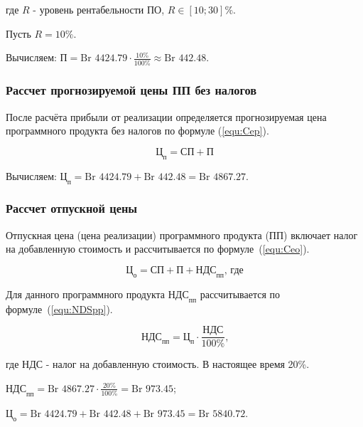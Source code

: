 где $R$ - уровень рентабельности ПО, $R \in [10;30]\%$.

Пусть $R = 10\%$.

Вычисляем: $\text{П} = \text{Br } 4424.79 \cdot \frac{ 10\% }{ 100\% } \approx \text{Br } 442.48$.

\subsubsection*{Рассчет прогнозируемой цены ПП без налогов}

После расчёта прибыли от реализации определяется прогнозируемая цена программного продукта без налогов
по формуле (\ref{equ:Cep}).

\begin{equation}
    \label{equ:Cep}
    \text{Ц}_\text{п} = \text{СП} + \text{П}
\end{equation}

Вычисляем: $\text{Ц}_\text{п} = \text{Br } 4424.79 + \text{Br } 442.48 = \text{Br } 4867.27$.

\subsubsection*{Рассчет отпускной цены}

Отпускная цена (цена реализации) программного продукта (ПП) включает налог на добавленную стоимость и рассчитывается по формуле~(\ref{equ:Ceo}).

\begin{equation}
    \label{equ:Ceo}
    \text{Ц}_\text{о} = \text{СП} + \text{П} + \text{НДС}_\text{пп} \text{, где}
\end{equation}

Для данного программного продукта $\text{НДС}_\text{пп}$ рассчитывается по формуле~(\ref{equ:NDSpp}).

\begin{equation}
    \label{equ:NDSpp}
    \text{НДС}_\text{пп} = \text{Ц}_\text{п} \cdot \frac{ \text{НДС} }{ 100\% } \text{,}
\end{equation}

где $\text{НДС}$ - налог на добавленную стоимость.
В настоящее время 20\%.


$\text{НДС}_\text{пп} = \text{Br } 4867.27 \cdot \frac{ 20\% }{ 100\% } = \text{Br } 973.45$;

$\text{Ц}_\text{о} = \text{Br } 4424.79 + \text{Br } 442.48 + \text{Br } 973.45 = \text{Br } 5840.72$.

